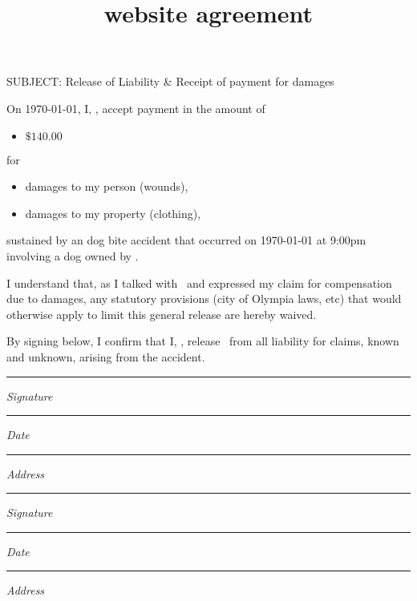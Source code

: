 \documentclass{letter}
\title{website agreement}
\newcommand{\namesigdate}[2][5cm]{%
\begin{minipage}{#1}
    #2 \vspace{1.0cm}\hrule\smallskip
    \small \textit{Signature}
    \vspace{1.0cm}\hrule\smallskip
    \small \textit{Date}
    \vspace{1.0cm}\hrule\smallskip
    \small \textit{Address}
\end{minipage}
}
\begin{document}
\begin{letter}{}

\opening{SUBJECT: Release of Liability \& Receipt of payment for damages}

On {\AdvanceDate[-1]\today}, I, \releasor, accept payment in the amount of 
\begin{itemize}
\item $\$140.00$ 
\end{itemize}
for
\begin{itemize}
\item damages to my person (wounds),
\item damages to my property (clothing),
\end{itemize}

sustained by an dog bite accident that occurred on {\AdvanceDate[-1]\today} at 9:00pm involving a dog owned by \releasee. 

I understand that, as I talked with \releasee\ and expressed my claim for compensation due to damages, any statutory provisions (city of Olympia laws, etc) that would otherwise apply to limit this general release are hereby waived.

By signing below, I confirm that I, \releasor, release \releasee\ from all liability for claims, known and unknown, arising from the accident.

\vspace{24pt}
\noindent \namesigdate{\releasor} \hfill \namesigdate{\releasee}

\end{letter}
\end{document}
